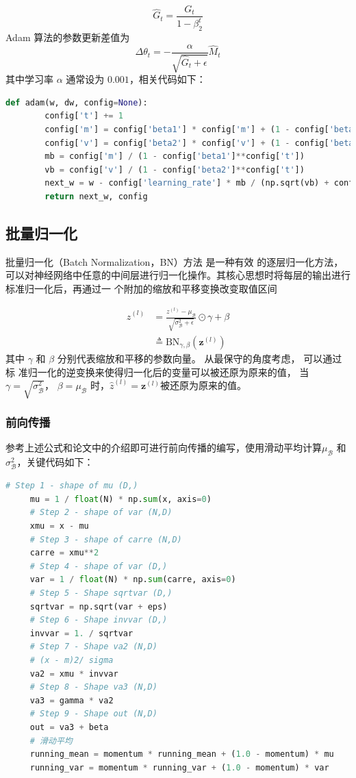 \documentclass[withoutpreface,bwprint]{cumcmthesis} %
\begin{document}
$$
\hat{G}_{t}=\frac{G_{t}}{1-\beta_{2}^{t}}
$$
Adam 算法的参数更新差值为
$$
\Delta \theta_{t}=-\frac{\alpha}{\sqrt{\hat{G}_{t}+\epsilon}} \hat{M}_{t}
$$
其中学习率 $\alpha$ 通常设为 $0.001$，相关代码如下：
\begin{lstlisting}[language=python]
	def adam(w, dw, config=None):
	    config['t'] += 1
	    config['m'] = config['beta1'] * config['m'] + (1 - config['beta1']) * dw
	    config['v'] = config['beta2'] * config['v'] + (1 - config['beta2']) * (dw**2)
	    mb = config['m'] / (1 - config['beta1']**config['t'])
	    vb = config['v'] / (1 - config['beta2']**config['t'])
	    next_w = w - config['learning_rate'] * mb / (np.sqrt(vb) + config['epsilon'])
	    return next_w, config
\end{lstlisting}

\subsection{批量归一化}

批量归一化（Batch Normalization，BN）方法\cite{3} 是一种有效
的逐层归一化方法，可以对神经网络中任意的中间层进行归一化操作。其核心思想时将每层的输出进行标准归一化后，再通过一
个附加的缩放和平移变换改变取值区间

$$
\begin{aligned}
\hat{z}^{(l)} &=\frac{z^{(l)}-\mu_{\mathcal{B}}}{\sqrt{\sigma_{\mathcal{B}}^{2}+\epsilon}} \odot \gamma+\beta \\
& \triangleq \mathrm{BN}_{\gamma, \beta}\left(\boldsymbol{z}^{(l)}\right)
\end{aligned}
$$
其中 $\gamma$ 和 $\beta$ 分别代表缩放和平移的参数向量。 从最保守的角度考虑， 可以通过标 准归一化的逆变换来使得归一化后的变量可以被还原为原来的值， 当 $\gamma=\sqrt{\sigma_{\mathcal{B}}^{2}}$， $\beta=\mu_{\mathcal{B}}$ 时，$\hat{z}^{(l)}=\boldsymbol{z}^{(l)} $被还原为原来的值。

\subsubsection{前向传播}
参考上述公式和论文\cite{3}中的介绍即可进行前向传播的编写，使用滑动平均计算$
\mu_{\mathcal{B}}$ 和  $\sigma_{\mathcal{B}}^{2}
$，关键代码如下：
\begin{lstlisting}[language=python]
	 # Step 1 - shape of mu (D,)
     mu = 1 / float(N) * np.sum(x, axis=0)
     # Step 2 - shape of var (N,D)
     xmu = x - mu
     # Step 3 - shape of carre (N,D)
     carre = xmu**2
     # Step 4 - shape of var (D,)
     var = 1 / float(N) * np.sum(carre, axis=0)
     # Step 5 - Shape sqrtvar (D,)
     sqrtvar = np.sqrt(var + eps)
     # Step 6 - Shape invvar (D,)
     invvar = 1. / sqrtvar
     # Step 7 - Shape va2 (N,D)
     # (x - m)2/ sigma 
     va2 = xmu * invvar
     # Step 8 - Shape va3 (N,D)
     va3 = gamma * va2
     # Step 9 - Shape out (N,D)
     out = va3 + beta
     # 滑动平均
     running_mean = momentum * running_mean + (1.0 - momentum) * mu
     running_var = momentum * running_var + (1.0 - momentum) * var
\end{lstlisting}
\end{document}
